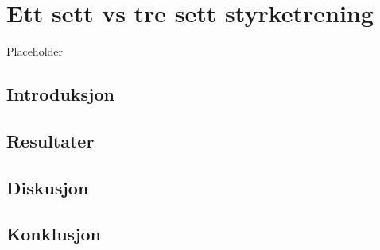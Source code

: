 \documentclass[
]{book}
\begin{document}
\hypertarget{ett-sett-vs-tre-sett-styrketrening}{%
\chapter{Ett sett vs tre sett styrketrening}\label{ett-sett-vs-tre-sett-styrketrening}}

Placeholder

\hypertarget{introduksjon-1}{%
\section{Introduksjon}\label{introduksjon-1}}

\hypertarget{resultater-1}{%
\section{Resultater}\label{resultater-1}}

\hypertarget{diskusjon-1}{%
\section{Diskusjon}\label{diskusjon-1}}

\hypertarget{konklusjon}{%
\section{Konklusjon}\label{konklusjon}}

  
\end{document}
